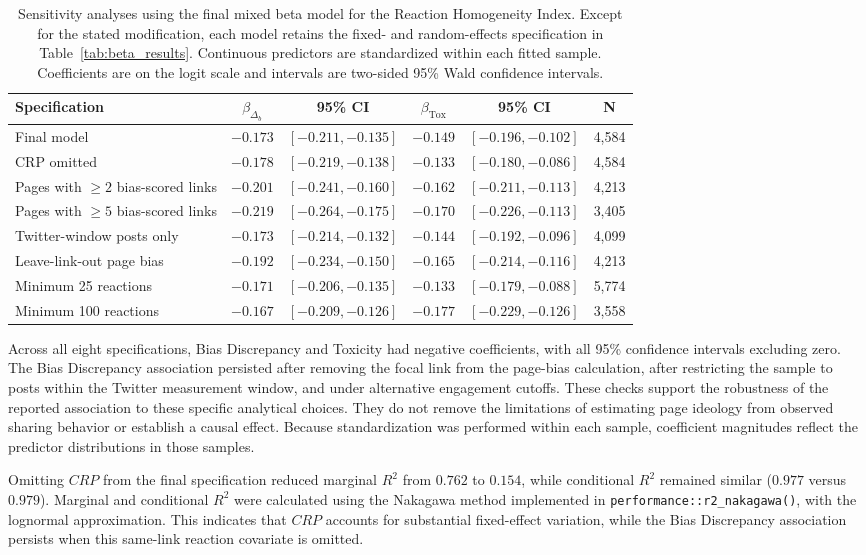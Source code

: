 \begin{table}[htb]
\centering
\footnotesize
\setlength{\tabcolsep}{3pt}
\caption{Sensitivity analyses using the final mixed beta model for the
Reaction Homogeneity Index. Except for the stated modification, each model
retains the fixed- and random-effects specification in
Table~\ref{tab:beta_results}. Continuous predictors are standardized within
each fitted sample. Coefficients are on the logit scale and intervals are
two-sided 95\% Wald confidence intervals.}
\label{tab:robustness_final}
\begin{tabular}{p{3.7cm}ccccc}
\toprule
\textbf{Specification} & $\beta_{\Delta_b}$ & \textbf{95\% CI}
& $\beta_{\mathrm{Tox}}$ & \textbf{95\% CI} & \textbf{N} \\
\midrule
Final model & $-0.173$ & $[-0.211, -0.135]$ & $-0.149$ & $[-0.196, -0.102]$ & 4,584 \\
CRP omitted & $-0.178$ & $[-0.219, -0.138]$ & $-0.133$ & $[-0.180, -0.086]$ & 4,584 \\
Pages with $\geq 2$ bias-scored links & $-0.201$ & $[-0.241, -0.160]$ & $-0.162$ & $[-0.211, -0.113]$ & 4,213 \\
Pages with $\geq 5$ bias-scored links & $-0.219$ & $[-0.264, -0.175]$ & $-0.170$ & $[-0.226, -0.113]$ & 3,405 \\
Twitter-window posts only & $-0.173$ & $[-0.214, -0.132]$ & $-0.144$ & $[-0.192, -0.096]$ & 4,099 \\
Leave-link-out page bias & $-0.192$ & $[-0.234, -0.150]$ & $-0.165$ & $[-0.214, -0.116]$ & 4,213 \\
Minimum 25 reactions & $-0.171$ & $[-0.206, -0.135]$ & $-0.133$ & $[-0.179, -0.088]$ & 5,774 \\
Minimum 100 reactions & $-0.167$ & $[-0.209, -0.126]$ & $-0.177$ & $[-0.229, -0.126]$ & 3,558 \\
\bottomrule
\end{tabular}
\end{table}

Across all eight specifications, Bias Discrepancy and Toxicity had
negative coefficients, with all 95\% confidence intervals excluding zero.
The Bias Discrepancy association persisted after removing the focal link
from the page-bias calculation, after restricting the sample to posts
within the Twitter measurement window, and under alternative engagement
cutoffs. These checks support the robustness of the reported association
to these specific analytical choices. They do not remove the limitations
of estimating page ideology from observed sharing behavior or establish a
causal effect. Because standardization was performed within each sample,
coefficient magnitudes reflect the predictor distributions in those samples.

Omitting $CRP$ from the final specification reduced marginal $R^2$
from $0.762$ to $0.154$, while conditional
$R^2$ remained similar ($0.977$ versus $0.979$).
Marginal and conditional $R^2$ were calculated using the Nakagawa
method implemented in \texttt{performance::r2\_nakagawa()}, with the
lognormal approximation. This indicates that $CRP$ accounts for substantial
fixed-effect variation, while the Bias Discrepancy association persists
when this same-link reaction covariate is omitted.

